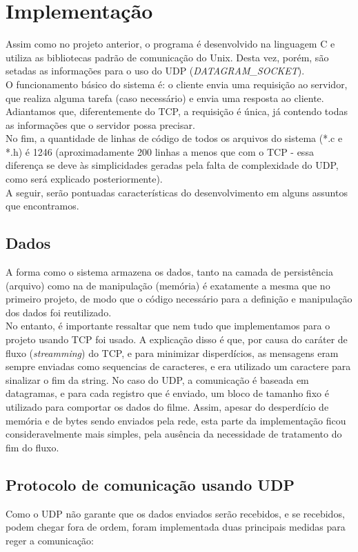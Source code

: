 \documentclass[11pt,twoside]{article}
\begin{document}
\section{Implementação}
Assim como no projeto anterior, o programa é desenvolvido na linguagem C e utiliza as bibliotecas padrão de comunicação do Unix. Desta vez, porém, são setadas as informações para o uso do UDP (\textit{DATAGRAM\_SOCKET}).\\
O funcionamento básico do sistema é: o cliente envia uma requisição ao servidor, que realiza alguma tarefa (caso necessário) e envia uma resposta ao cliente. Adiantamos que, diferentemente do TCP, a requisição é única, já contendo todas as informações que o servidor possa precisar.\\
No fim, a quantidade de linhas de código de todos os arquivos do sistema (*.c e *.h) é 1246 (aproximadamente 200 linhas a menos que com o TCP - essa diferença se deve às simplicidades geradas pela falta de complexidade do UDP, como será explicado posteriormente).\\
A seguir, serão pontuadas características do desenvolvimento em alguns assuntos que encontramos.\\

\subsection{Dados}
A forma como o sistema armazena os dados, tanto na camada de persistência (arquivo) como na de manipulação (memória) é exatamente a mesma que no primeiro projeto, de modo que o código necessário para a definição e manipulação dos dados foi reutilizado.\\
No entanto, é importante ressaltar que nem tudo que implementamos para o projeto usando TCP foi usado. A explicação disso é que, por causa do caráter de fluxo (\textit{streamming}) do TCP, e para minimizar disperdícios, as mensagens eram sempre enviadas como sequencias de caracteres, e era utilizado um caractere para sinalizar o fim da string. No caso do UDP, a comunicação é baseada em datagramas, e para cada registro que é enviado, um bloco de tamanho fixo é utilizado para comportar os dados do filme. Assim, apesar do desperdício de memória e de bytes sendo enviados pela rede, esta parte da implementação ficou consideravelmente mais simples, pela ausência da necessidade de tratamento do fim do fluxo.\\

\subsection{Protocolo de comunicação usando UDP}
Como o UDP não garante que os dados enviados serão recebidos, e se recebidos, podem chegar fora de ordem, foram implementada duas principais medidas para reger a comunicação:
\end{document}

